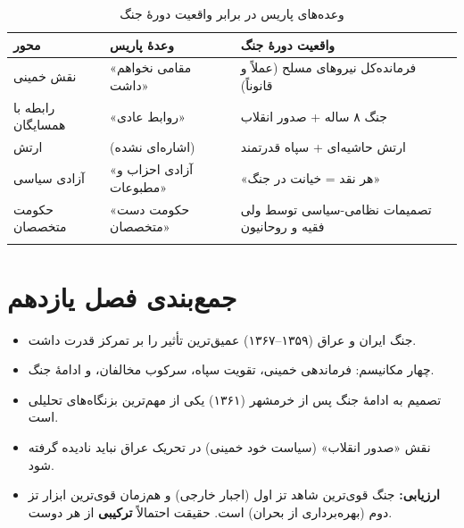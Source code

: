 \documentclass[12pt,a4paper]{book}
\newcommand{\keyword}[1]{\textbf{\textcolor{cPrimary}{#1}}}
\begin{document}
\begin{longtable}{%
    >{\raggedleft\arraybackslash}p{}
    >{\raggedleft\arraybackslash}p{}
    >{\raggedleft\arraybackslash}p{}}
\toprule
\rowcolor{cPrimary!10}
\textbf{محور} & \textbf{وعدهٔ پاریس} & \textbf{واقعیت دورهٔ جنگ} \\
\midrule
\endhead

نقش خمینی &
«مقامی نخواهم داشت» &
فرمانده‌کل نیروهای مسلح (عملاً و قانوناً) \\
\midrule

رابطه با همسایگان &
«روابط عادی» &
جنگ ۸ ساله + صدور انقلاب \\
\midrule

ارتش &
(اشاره‌ای نشده) &
ارتش حاشیه‌ای + سپاه قدرتمند \\
\midrule

آزادی سیاسی &
«آزادی احزاب و مطبوعات» &
«هر نقد = خیانت در جنگ» \\
\midrule

حکومت متخصصان &
«حکومت دست متخصصان» &
تصمیمات نظامی-سیاسی توسط ولی فقیه و روحانیون \\

\bottomrule
\caption{وعده‌های پاریس در برابر واقعیت دورهٔ جنگ}
\label{tab:promise-reality-war}
\end{longtable}

\section{جمع‌بندی فصل یازدهم}

\begin{principleBox}
\begin{itemize}[label=\textcolor{cPrimary}{$\blacksquare$}, rightmargin=2em]
    \item جنگ ایران و عراق (۱۳۵۹–۱۳۶۷) عمیق‌ترین تأثیر را بر تمرکز قدرت داشت.
    \item چهار مکانیسم: فرماندهی خمینی، تقویت سپاه، سرکوب مخالفان، و ادامهٔ جنگ.
    \item تصمیم به ادامهٔ جنگ پس از خرمشهر (۱۳۶۱) یکی از مهم‌ترین بزنگاه‌های تحلیلی است.
    \item نقش «صدور انقلاب» (سیاست خود خمینی) در تحریک عراق نباید نادیده گرفته شود.
    \item \keyword{ارزیابی:} جنگ قوی‌ترین شاهد تز اول (اجبار خارجی) و هم‌زمان قوی‌ترین ابزار تز دوم (بهره‌برداری از بحران) است. حقیقت احتمالاً \keyword{ترکیبی} از هر دوست.
\end{itemize}
\end{principleBox}
\end{document}

